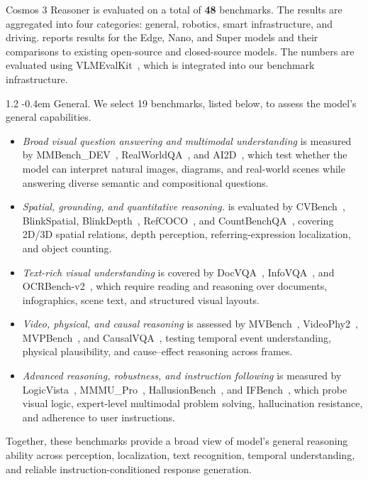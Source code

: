 \documentclass{llmxive}
\makeatletter
\providecommand{\paragraph}{  \@startsection{paragraph}{4}{\z@}    {1\baselineskip \@plus .2\baselineskip}    {-0.4em}    {\normalfont\normalsize\bfseries}}
\makeatother
\begin{document}
Cosmos 3 Reasoner is evaluated on a total of \textbf{48} benchmarks. The results are aggregated into four categories: general, robotics, smart infrastructure, and driving.  reports results for the Edge, Nano, and Super models and their comparisons to existing open-source and closed-source models. The numbers are evaluated using VLMEvalKit~\cite{duan2024vlmevalkit}, which is integrated into our benchmark infrastructure.

\paragraph{General.} We select 19 benchmarks, listed below, to assess the model's general capabilities.
\begin{itemize}
  \item \textit{Broad visual question answering and multimodal understanding} is measured by MMBench\_DEV~\citep{liu2024mmbench}, RealWorldQA~\citep{xai2024realworldqa}, and AI2D~\citep{kembhavi2016ai2d}, which test whether the model can interpret natural images, diagrams, and real-world scenes while answering diverse semantic and compositional questions.
  \item \textit{Spatial, grounding, and quantitative reasoning.} is evaluated by CVBench~\citep{tong2024cambrian}, BlinkSpatial, BlinkDepth~\citep{fu2024blink}, RefCOCO~\citep{yu2016refcoco}, and CountBenchQA~\citep{paiss2023countbench}, covering 2D/3D spatial relations, depth perception,
  referring-expression localization, and object counting.
  \item \textit{Text-rich visual understanding} is covered by DocVQA~\citep{mathew2021docvqa}, InfoVQA~\citep{mathew2022infographicvqa}, and OCRBench-v2~\citep{fu2026ocrbench}, which require reading and reasoning over documents, infographics, scene text, and structured
  visual layouts.
  \item \textit{Video, physical, and causal reasoning} is assessed by MVBench~\citep{li2024mvbench}, VideoPhy2~\citep{bansal2025videophy}, MVPBench~\citep{krojer2025shortcut}, and CausalVQA~\citep{foss2025causalvqa}, testing temporal event understanding, physical plausibility, and cause--effect
  reasoning across frames.
  \item \textit{Advanced reasoning, robustness, and instruction following} is measured by LogicVista~\citep{xiao2024logicvista}, MMMU\_Pro~\citep{yue2024mmmupro}, HallusionBench~\citep{guan2024hallusionbench}, and IFBench~\citep{pyatkin2025ifbench}, which probe visual logic, expert-level multimodal problem solving, hallucination resistance, and adherence to user instructions.
\end{itemize}
Together, these benchmarks provide a broad view of model's general reasoning ability across perception, localization, text recognition, temporal understanding, and reliable instruction-conditioned response generation.
\end{document}
